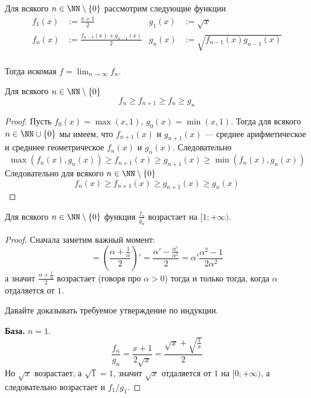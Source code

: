 \documentclass[12pt,a4paper]{article}
\begin{document}
    \begin{enumproblem}\label{prb-4}
        Для всякого $n \in \NN \setminus \{0\}$ рассмотрим следующие функции
        \begin{align*}
            f_1(x) &:= \frac{x+1}{2}&
            g_1(x) &:= \sqrt{x}\\
            f_n(x) &:= \frac{f_{n-1}(x)+g_{n-1}(x)}{2}&
            g_n(x) &:= \sqrt{f_{n-1}(x)g_{n-1}(x)}\\
        \end{align*}

        Тогда искомая $f = \lim_{n \to \infty} f_n$.

        \begin{lemma}
            Для всякого $n \in \NN \setminus \{0\}$
            \[f_n \geqslant f_{n+1} \geqslant f_n \geqslant g_n\]
        \end{lemma}

        \begin{proof}
            Пусть $f_0(x) = \max(x, 1)$, $g_0(x) = \min(x, 1)$. Тогда для всякого $n \in \NN \cup \{0\}$ мы имеем, что $f_{n+1}(x)$ и $g_{n+1}(x)$ --- среднее арифметическое и средннее геометрическое $f_n(x)$ и $g_n(x)$. Следовательно
            \[\max(f_n(x), g_n(x)) \geqslant f_{n+1}(x) \geqslant g_{n+1}(x) \geqslant \min(f_n(x), g_n(x))\]
            Следовательно для всякого $n \in \NN \setminus \{0\}$
            \[f_n(x) \geqslant f_{n+1}(x) \geqslant g_{n+1}(x) \geqslant g_n(x)\]
        \end{proof}

        \begin{lemma}
            Для всякого $n \in \NN \setminus \{0\}$ функция $\frac{f_n}{g_n}$ возрастает на $[1; +\infty)$.
        \end{lemma}

        \begin{proof}
            Сначала заметим важный момент:
            \[
                = \left(\frac{\alpha + \frac{1}{\alpha}}{2}\right)'
                = \frac{\alpha' - \frac{\alpha'}{\alpha^2}}{2}
                = \alpha' \frac{\alpha^2 - 1}{2 \alpha^2}
            \]
            а значит $\frac{\alpha + \frac{1}{\alpha}}{2}$ возрастает (говоря про $\alpha > 0$) тогда и только тогда, когда $\alpha$ отдаляется от $1$.

            Давайте доказывать требуемое утверждение по индукции.

            \textbf{База.} $n = 1$.
            \[\frac{f_n}{g_n} = \frac{x+1}{2\sqrt{x}} = \frac{\sqrt{x} + \sqrt{\frac{1}{x}}}{2}\]
            Но $\sqrt{x}$ возрастает, а $\sqrt{1} = 1$, значит $\sqrt{x}$ отдаляется от $1$ на $[0; + \infty)$, а следовательно возрастает и $f_1/g_1$.


\end{proof}
\end{enumproblem}
\end{document}
